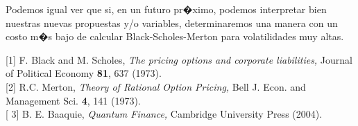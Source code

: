 \documentclass[portrait, a0b,final]{a0poster}%
\numberwithin{equation}{section}
\newenvironment{poster}{
  \begin{center}
  \begin{minipage}[c]{0.98\textwidth}
}{
  \end{minipage}
  \end{center}
}
\newenvironment{pcolumn}[1]{
  \begin{minipage}{#1\textwidth}
  \begin{center}
}{
  \end{center}
  \end{minipage}
}
\newcommand{\pbox}[4]{
\psshadowbox[#3]{
\begin{minipage}[t][#2][t]{#1}
#4
\end{minipage}
}}
\begin{document}
\begin{poster}
\begin{center}
\begin{pcolumn}{0.32}
{Podemos igual ver que si, en un futuro pr�ximo, podemos interpretar bien nuestras nuevas propuestas y/o variables, determinaremos una manera con un costo m�s bajo de calcular Black-Scholes-Merton para volatilidades muy altas.


\vspace{2cm}
    \begin{center}
        \pbox{0.8\textwidth}{}%
        {linewidth=2mm,framearc=0.1,linecolor=lightblue,fillstyle=gradient,gradangle=0,%
        gradbegin=white,gradend=whiteblue,gradmidpoint=1.0,framesep=1em}{%
        \begin{center}
          Referencias
        \end{center}}
    \end{center}






[1] F. Black and  M. Scholes, {\it The pricing options and corporate liabilities,} Journal of Political Economy  {\bf 81},  637 (1973).\\
 
[2] R.C. Merton, {\it Theory of Rational Option Pricing,}  Bell J. Econ. and Management Sci.   {\bf 4},  141 (1973).\\

[ 3] B. E. Baaquie,  {\it Quantum Finance,} Cambridge University Press (2004).


}
\end{pcolumn}
\end{center}




\end{poster}
\end{document}
